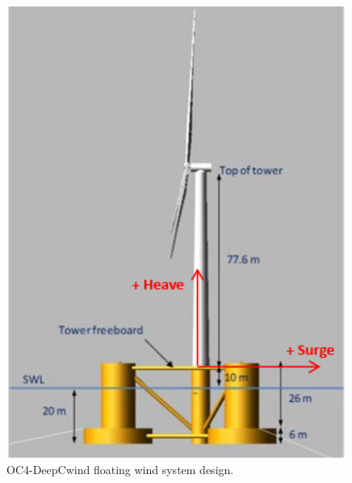 \documentclass[a4paper, 11pt]{article}
\begin{document}
\begin{figure}[H]
    \begin{minipage}{0.47\textwidth}
        \centering
        \includegraphics[width=0.99\textwidth]{OC4.png}
        \caption{\small OC4-DeepCwind floating wind system design. \cite{Robertson2014}}
        \label{fig:OC4}
    \end{minipage}
    \hfill
    \begin{minipage}{0.5\textwidth}
        \centering

\end{minipage}
\end{figure}
\end{document}
